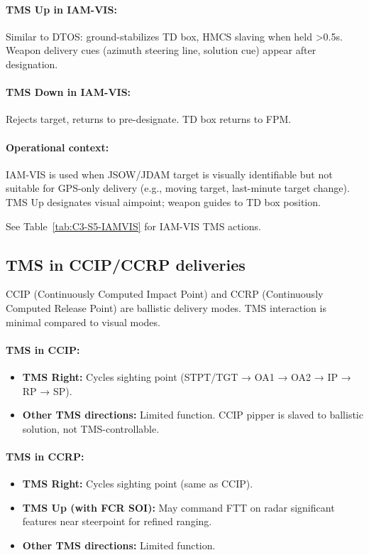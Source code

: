 \documentclass[11pt, a4paper, twoside]{report}
\begin{document}
\paragraph{TMS Up in IAM-VIS:}
Similar to DTOS: ground-stabilizes TD box, HMCS slaving when held >0.5s. Weapon delivery cues (azimuth steering line, solution cue) appear after designation.

\paragraph{TMS Down in IAM-VIS:}
Rejects target, returns to pre-designate. TD box returns to FPM.

\paragraph{Operational context:}
IAM-VIS is used when JSOW/JDAM target is visually identifiable but not suitable for GPS-only delivery (e.g., moving target, last-minute target change). TMS Up designates visual aimpoint; weapon guides to TD box position.

See Table~\ref{tab:C3-S5-IAMVIS} for IAM-VIS TMS actions.

\subsection{TMS in CCIP/CCRP deliveries}
\label{sec:C3-S5-S4}

CCIP (Continuously Computed Impact Point) and CCRP (Continuously Computed Release Point) are ballistic delivery modes. TMS interaction is minimal compared to visual modes.

\paragraph{TMS in CCIP:}
\begin{itemize}
    \item \textbf{TMS Right:} Cycles sighting point (STPT/TGT → OA1 → OA2 → IP → RP → SP).
    \item \textbf{Other TMS directions:} Limited function. CCIP pipper is slaved to ballistic solution, not TMS-controllable.
\end{itemize}

\paragraph{TMS in CCRP:}
\begin{itemize}
    \item \textbf{TMS Right:} Cycles sighting point (same as CCIP).
    \item \textbf{TMS Up (with FCR SOI):} May command FTT on radar significant features near steerpoint for refined ranging.
    \item \textbf{Other TMS directions:} Limited function.
\end{itemize}
\end{document}
